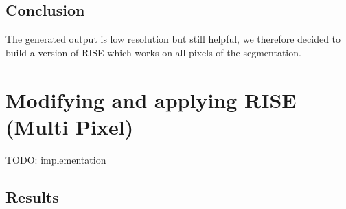 \subsection{Conclusion}
The generated output is low resolution but still helpful, we therefore decided to build a version of RISE which works on all pixels of the segmentation.

\section{Modifying and applying RISE (Multi Pixel)}

TODO: implementation

\subsection{Results}

